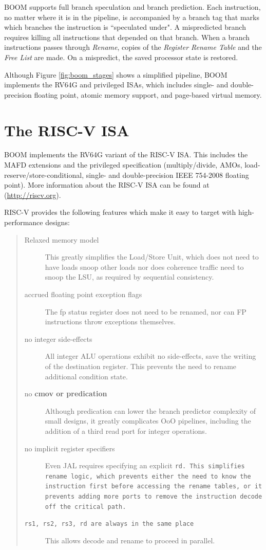 

  
BOOM supports full branch speculation and branch prediction.  Each instruction, no matter where it is in the pipeline,  is accompanied by a branch tag that marks which branches the instruction is ``speculated under". A mispredicted branch requires killing all instructions that depended on that branch.  When a branch instructions passes through {\em Rename}, copies of the {\em Register Rename Table} and the {\em Free List} are made.  On a mispredict, the saved processor state is restored.

Although Figure \ref{fig:boom_stages} shows a simplified pipeline, BOOM implements the RV64G and privileged ISAs, which includes single- and double-precision floating point, atomic memory support, and page-based virtual memory. 



\section{The RISC-V ISA}

BOOM implements the RV64G variant of the RISC-V ISA. This includes the MAFD
extensions and the privileged specification (multiply/divide, AMOs,
load-reserve/store-conditional, single- and double-precision IEEE
754-2008 floating point). More information about the RISC-V
ISA can be found at (\url{http://riscv.org}).

RISC-V provides the following features which make it easy to target with high-performance designs:

\begin{quote}
\begin{description}
\item [Relaxed memory model] This greatly simplifies the Load/Store Unit, which does not need to have loads snoop other loads nor does coherence traffic need to snoop the LSU, as required by sequential consistency.
\item [accrued floating point exception flags] The fp status register does not need to be renamed, nor can FP instructions throw exceptions themselves. 
\item [no integer side-effects] All integer ALU operations exhibit no side-effects, save the writing of the destination register. This prevents the need to rename additional condition state.
\item [no \bf{cmov} or predication] Although predication can lower the branch predictor complexity of small designs, it greatly complicates OoO pipelines, including the addition of a third read port for integer operations.
\item [no implicit register specifiers] Even JAL requires specifying an explicit \tt{rd}. This simplifies rename logic, which prevents either the need to know the instruction first before accessing the rename tables, or it prevents adding more ports to remove the instruction decode off the critical path.
\item [\tt{rs1}, \tt{rs2}, \tt{rs3}, \tt{rd} are always in the same place] This allows decode and rename to proceed in parallel. 

\end{description}
\end{quote}

